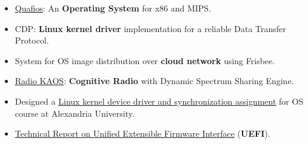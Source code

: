 \documentclass[letterpaper]{twentysecondcv} %
\newcommand{\myhy}[2]{\underline{\href{#1}{#2}}}
\begin{document}
\begin{itemize}
    \item{\myhy{https://github.com/quafios/quafios}{Quafios}:
          An \textbf{{Operating System}} for x86 and MIPS.
          }
    \item{CDP: \textbf{{Linux kernel driver}} implementation for a reliable Data Transfer Protocol.}
    \item{System for OS image distribution over \textbf{{cloud network}} using Frisbee.}
    \item{\myhy{https://github.com/iocoder/wncp}{Radio KAOS}: \textbf{{Cognitive Radio}} with Dynamic Spectrum Sharing Engine.}
    \item{Designed a \myhy{https://github.com/iocoder/cs333_f16_lab2/raw/master/CS333_F16_Lab2.pdf}{Linux kernel device driver and synchronization assignment}
          for OS course at Alexandria University.}
    \item{\myhy{https://github.com/iocoder/uefi_report/raw/master/final_report.pdf}{Technical Report on Unified Extensible Firmware Interface}
          (\textbf{{UEFI}}).}

\end{itemize}
\end{document}
